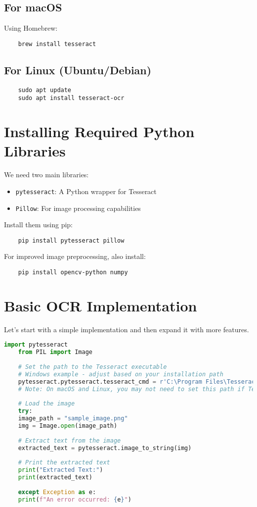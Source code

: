 \subsection{For macOS}
Using Homebrew:
\begin{verbatim}
	brew install tesseract
\end{verbatim}

\subsection{For Linux (Ubuntu/Debian)}
\begin{verbatim}
	sudo apt update
	sudo apt install tesseract-ocr
\end{verbatim}

\section{Installing Required Python Libraries}
We need two main libraries:
\begin{itemize}
	\item \texttt{pytesseract}: A Python wrapper for Tesseract
	\item \texttt{Pillow}: For image processing capabilities
\end{itemize}

Install them using pip:
\begin{verbatim}
	pip install pytesseract pillow
\end{verbatim}

For improved image preprocessing, also install:
\begin{verbatim}
	pip install opencv-python numpy
\end{verbatim}

\section{Basic OCR Implementation}
Let's start with a simple implementation and then expand it with more features.

\begin{lstlisting}[language=Python]
	import pytesseract
	from PIL import Image
	
	# Set the path to the Tesseract executable
	# Windows example - adjust based on your installation path
	pytesseract.pytesseract.tesseract_cmd = r'C:\Program Files\Tesseract-OCR\tesseract.exe'
	# Note: On macOS and Linux, you may not need to set this path if Tesseract is in your PATH
	
	# Load the image
	try:
	image_path = "sample_image.png"
	img = Image.open(image_path)
	
	# Extract text from the image
	extracted_text = pytesseract.image_to_string(img)
	
	# Print the extracted text
	print("Extracted Text:")
	print(extracted_text)
	
	except Exception as e:
	print(f"An error occurred: {e}")
\end{lstlisting}

